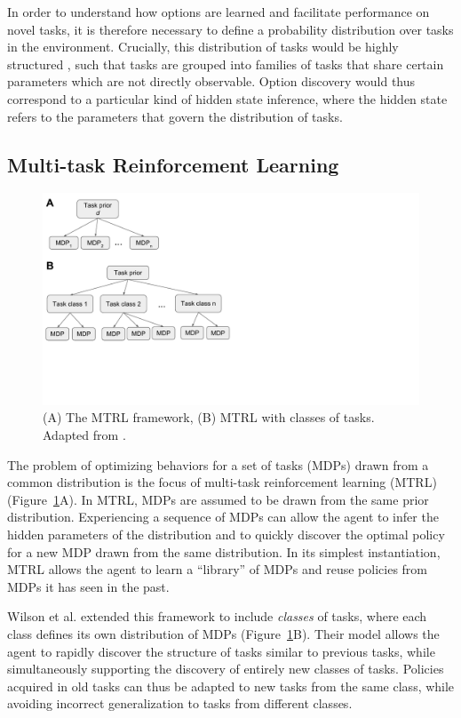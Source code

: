 \documentclass[11pt]{article}
\begin{document}
In order to understand how options are learned and facilitate performance on novel tasks, it is therefore necessary to define a probability distribution over tasks in the environment. Crucially, this distribution of tasks would be highly structured \cite{Botvinick2015}, such that tasks are grouped into families of tasks that share certain parameters which are not directly observable. Option discovery would thus correspond to a particular kind of hidden state inference, where the hidden state refers to the parameters that govern the distribution of tasks.

\subsection{Multi-task Reinforcement Learning}

\begin{figure}
\centering
\includegraphics[scale=0.7,  trim = 0 120 400 10]{figures/wilson.pdf}
\caption{(A) The MTRL framework, (B) MTRL with classes of tasks. Adapted from \cite{Wilson2007}.}
\label{fig:mtrl}
\end{figure}

The problem of optimizing behaviors for a set of tasks (MDPs) drawn from a common distribution is the focus of multi-task reinforcement learning (MTRL) (Figure~\ref{fig:mtrl}A). In MTRL, MDPs are assumed to be drawn from the same prior distribution. Experiencing a sequence of MDPs can allow the agent to infer the hidden parameters of the distribution and to quickly discover the optimal policy for a new MDP drawn from the same distribution. In its simplest instantiation, MTRL allows the agent to learn a ``library'' of MDPs and reuse policies from MDPs it has seen in the past.

Wilson et al. \cite{Wilson2007} extended this framework to include \textit{classes} of tasks, where each class defines its own distribution of MDPs (Figure~\ref{fig:mtrl}B). Their model allows the agent to rapidly discover the structure of tasks similar to previous tasks, while simultaneously supporting the discovery of entirely new classes of tasks. Policies acquired in old tasks can thus be adapted to new tasks from the same class, while avoiding incorrect generalization to tasks from different classes.
\end{document}
